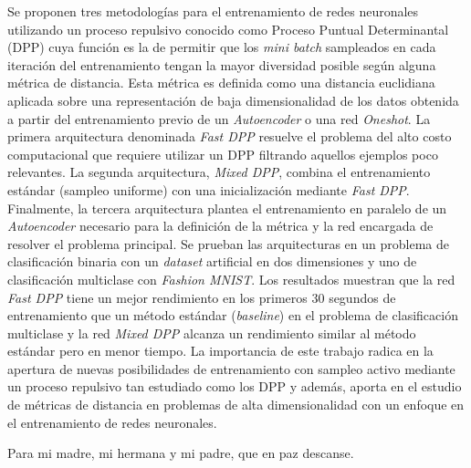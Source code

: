 \documentclass[
	spanish, %
	letterpaper, oneside
]{book}
\begin{document}
	
\templatePortrait

\templatePagecfg

\begin{abstractd}

Se proponen tres metodologías para el entrenamiento de redes neuronales utilizando un proceso repulsivo conocido como Proceso Puntual Determinantal (DPP) cuya función es la de permitir que los \textit{mini batch} sampleados en cada iteración del entrenamiento tengan la mayor diversidad posible según alguna métrica de distancia. Esta métrica es definida como una distancia euclidiana aplicada sobre una representación de baja dimensionalidad de los datos obtenida a partir del entrenamiento previo de un \textit{Autoencoder} o una red \textit{Oneshot}. La primera arquitectura denominada \textit{Fast DPP} resuelve el problema del alto costo computacional que requiere utilizar un DPP filtrando aquellos ejemplos poco relevantes. La segunda arquitectura, \textit{Mixed DPP}, combina el entrenamiento estándar (sampleo uniforme) con una inicialización mediante \textit{Fast DPP}. Finalmente, la tercera arquitectura plantea el entrenamiento en paralelo de un \textit{Autoencoder} necesario para la definición de la métrica y la red encargada de resolver el problema principal. Se prueban las arquitecturas en un problema de clasificación binaria con un \textit{dataset} artificial en dos dimensiones y uno de clasificación multiclase con \textit{Fashion MNIST}. Los resultados muestran que la red \textit{Fast DPP} tiene un mejor rendimiento en los primeros 30 segundos de entrenamiento que un método estándar (\textit{baseline}) en el problema de clasificación multiclase y la red \textit{Mixed DPP} alcanza un rendimiento similar al método estándar pero en menor tiempo. La importancia de este trabajo radica en la apertura de nuevas posibilidades de entrenamiento con sampleo activo mediante un proceso repulsivo tan estudiado como los DPP y además, aporta en el estudio de métricas de distancia en problemas de alta dimensionalidad con un enfoque en el entrenamiento de redes neuronales.

\end{abstractd}

\begin{dedicatory}
	Para mi madre, mi hermana y mi padre, que en paz descanse. \\
\end{dedicatory}
\end{document}
